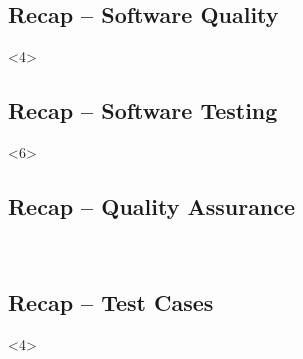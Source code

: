 \subsection{Recap -- Software Quality}
\begin{frame}<4>{\insertsubsection}
	\slideSoftwareQuality
\end{frame}

\subsection{Recap -- Software Testing}
\begin{frame}<6>{\insertsubsection}
	\slideSoftwareTesting
\end{frame}

\subsection{Recap -- Quality Assurance}
\begin{frame}{\insertsubsection\ \mytitlesource{\ludewiglichter}}
	\slideMindmapQualityAssurance{}{}{}{}{}{}{}
\end{frame}

\subsection{Recap -- Test Cases}
\begin{frame}<4>{\insertsubsection}
	\begin{fancycolumns}[animation=none]
		\explTestCases
		\nextcolumn
		\figTestDesign
	\end{fancycolumns}
	
\end{frame}

